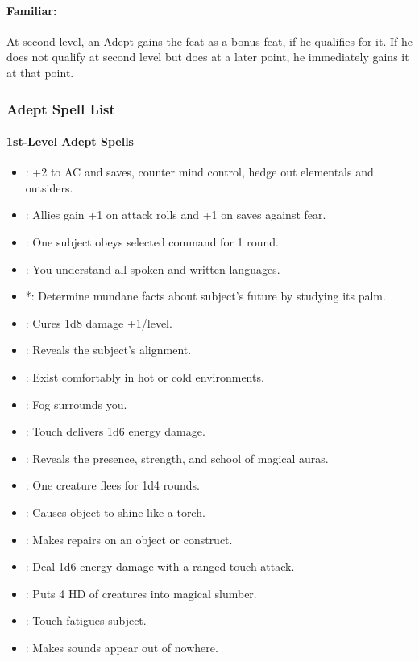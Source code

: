 \paragraph{Familiar:}
At second level, an Adept gains the  feat as a bonus feat, if he qualifies for it.
If he does not qualify at second level but does at a later point, he immediately gains it at that point.

\subsubsection{Adept Spell List}
\paragraph{1st-Level Adept Spells}
\begin{itemize}
\item {}: +2 to AC and saves, counter mind control, hedge out elementals and outsiders.
\item {}: Allies gain +1 on attack rolls and +1 on saves against fear.
\item {}: One subject obeys selected command for 1 round.
\item {}: You understand all spoken and written languages.
\item {}*: Determine mundane facts about subject's future by studying its palm.
\item {}: Cures 1d8 damage +1/level.
\item {}: Reveals the subject's alignment.
\item {}: Exist comfortably in hot or cold environments.
\item {}: Fog surrounds you.
\item {}: Touch delivers 1d6 energy damage.
\item {}: Reveals the presence, strength, and school of magical auras.
\item {}: One creature flees for 1d4 rounds.
\item {}: Causes object to shine like a torch.
\item {}: Makes repairs on an object or construct.
\item {}: Deal 1d6 energy damage with a ranged touch attack.
\item {}: Puts 4 HD of creatures into magical slumber.
\item {}: Touch fatigues subject.
\item {}: Makes sounds appear out of nowhere.
\end{itemize}
